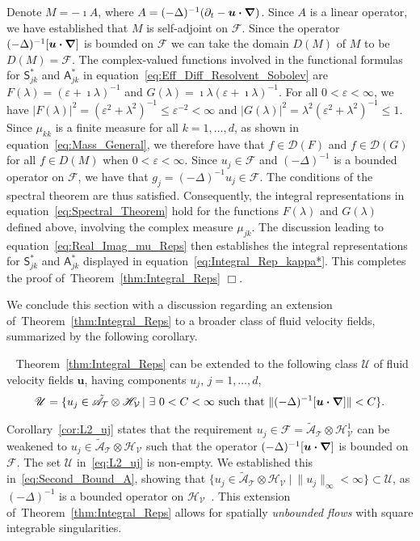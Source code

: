 \documentclass[leqno,onefignum,onetabnum]{siamltex1213}
\newcommand{\thmref}[1]{Theorem~\ref{#1}}
\newcommand{\corref}[1]{Corollary~\ref{#1}}
\newcommand{\Tc}{\mathcal{T}}
\newcommand{\Vc}{\mathcal{V}}
\newcommand{\Sm}{\mathsf{S}}
\newcommand{\Am}{\mathsf{A}}
\newcommand{\Hs}{\mathscr{H}}
\newcommand{\As}{\mathscr{A}}
\newcommand{\Ds}{\mathscr{D}}
\newcommand{\Fs}{\mathscr{F}}
\newcommand\bnabla{\mbox{\boldmath${\nabla}$}}
\providecommand\bcdot{\boldsymbol{\cdot}}
\newcommand{\vecu}{\boldsymbol{u}}
\begin{document}
Denote $M=-\imath A$, where $A=(-\Delta)^{-1}(\partial_t-\vecu\bcdot\bnabla)$. Since
$A$ is a linear operator, 
we have established that $M$ is
self-adjoint on $\Fs$. Since the operator 
$(-\Delta)^{-1}[\vecu\bcdot\bnabla]$ is bounded on $\Fs$ we can take the
domain $D(M)$ of $M$ to be $D(M)=\Fs$. The complex-valued functions
involved in the functional formulas for $\Sm^*_{jk}$ and $\Am^*_{jk}$
in equation~\eqref{eq:Eff_Diff_Resolvent_Sobolev} are $F(\lambda)=(\varepsilon+\imath\lambda)^{-1}$ 
and $G(\lambda)=\imath\lambda(\varepsilon+\imath\lambda)^{-1}$. For all $0<\varepsilon<\infty$,
we have $|F(\lambda)|^2=(\varepsilon^2+\lambda^2)^{-1}\leq\varepsilon^{-2}<\infty$ and 
$|G(\lambda)|^2=\lambda^2(\varepsilon^2+\lambda^2)^{-1}\leq 1$. Since $\mu_{kk}$ is a finite measure
for all $k=1,\ldots,d$, as shown in equation~\eqref{eq:Mass_General}, we
therefore have 
that $f\in\Ds(F)$ and $f\in\Ds(G)$ for all $f\in D(M)$ when $0<\varepsilon<\infty$. Since $u_j\in\Fs$ and $(-\Delta)^{-1}$ is a bounded operator on $\Fs$, we have that 
$g_j=(-\Delta)^{-1}u_j\in\Fs$. The conditions of the spectral theorem are
thus satisfied. Consequently, the integral representations in
equation~\eqref{eq:Spectral_Theorem} hold for the functions $F(\lambda)$ and
$G(\lambda)$ defined above, involving the complex measure $\mu_{jk}$. The
discussion leading to equation~\eqref{eq:Real_Imag_mu_Reps} then
establishes the integral representations for $\Sm^*_{jk}$ and
$\Am^*_{jk}$ displayed in equation~\eqref{eq:Integral_Rep_kappa*}.
This completes the proof of~\thmref{thm:Integral_Reps} $\Box$. 



We conclude this section with a discussion regarding an extension
of~\thmref{thm:Integral_Reps} to a broader class of 
fluid velocity fields, summarized by the following corollary.
%
\begin{corollary}~\label{cor:L2_uj}
  \thmref{thm:Integral_Reps} can be extended to the
  following class $\mathscr{U}$ of fluid velocity fields $\vecu$,
  having components $u_j$, $j=1,\ldots,d$,
  \begin{align}\label{eq:L2_uj}
    \mathscr{U}
    =\{u_j\in\tilde{\As}_{\Tc}\otimes\Hs_{\Vc} \,|\ \exists \ 0<C<\infty \text{ such that }
                                \|(-\Delta)^{-1}[\vecu\bcdot\bnabla]\|<C\}.
  \end{align}
\end{corollary}
%
\corref{cor:L2_uj} states that the requirement
$u_j\in\Fs=\tilde{\As}_{\Tc}\otimes\Hs^1_{\Vc}$ can be weakened to
$u_j\in\tilde{\As}_{\Tc}\otimes\Hs_{\Vc}$ such that the operator
$(-\Delta)^{-1}[\vecu\bcdot\bnabla]$ is bounded on $\Fs$. The set
$\mathscr{U}$ in~\eqref{eq:L2_uj} is non-empty. We established this
in~\eqref{eq:Second_Bound_A}, showing that  
$\{u_j\in\tilde{\As}_{\Tc}\otimes\Hs_{\Vc} \ |\ \|u_j\|_{\infty}<\infty\}\subset\mathscr{U}$, as
$(-\Delta)^{-1}$ is a bounded operator on
$\Hs_{\Vc}$~\cite{Stakgold:BVP:2000}. This extension
of~\thmref{thm:Integral_Reps} allows for spatially \emph{unbounded
  flows} with square integrable singularities. 
\end{document}
